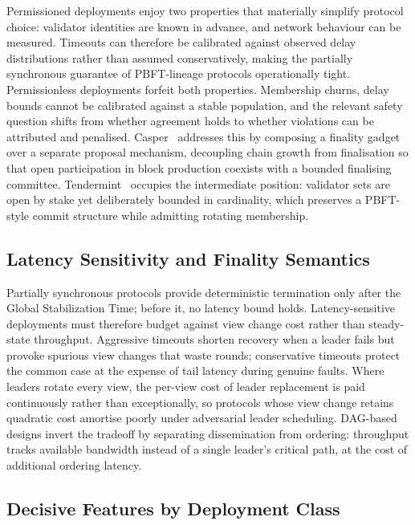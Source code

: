 Permissioned deployments enjoy two properties that materially simplify protocol choice: validator identities are known in advance, and network behaviour can be measured. Timeouts can therefore be calibrated against observed delay distributions rather than assumed conservatively, making the partially synchronous guarantee of PBFT-lineage protocols operationally tight. Permissionless deployments forfeit both properties. Membership churns, delay bounds cannot be calibrated against a stable population, and the relevant safety question shifts from whether agreement holds to whether violations can be attributed and penalised. Casper~\cite{buterin2020combining} addresses this by composing a finality gadget over a separate proposal mechanism, decoupling chain growth from finalisation so that open participation in block production coexists with a bounded finalising committee. Tendermint~\cite{buchman2016tendermint} occupies the intermediate position: validator sets are open by stake yet deliberately bounded in cardinality, which preserves a PBFT-style commit structure while admitting rotating membership.

\subsection{Latency Sensitivity and Finality Semantics}

Partially synchronous protocols provide deterministic termination only after the Global Stabilization Time; before it, no latency bound holds. Latency-sensitive deployments must therefore budget against view change cost rather than steady-state throughput. Aggressive timeouts shorten recovery when a leader fails but provoke spurious view changes that waste rounds; conservative timeouts protect the common case at the expense of tail latency during genuine faults. Where leaders rotate every view, the per-view cost of leader replacement is paid continuously rather than exceptionally, so protocols whose view change retains quadratic cost amortise poorly under adversarial leader scheduling. DAG-based designs invert the tradeoff by separating dissemination from ordering: throughput tracks available bandwidth instead of a single leader's critical path, at the cost of additional ordering latency.

\subsection{Decisive Features by Deployment Class}

